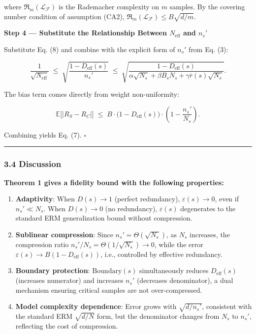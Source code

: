 \documentclass[
  12pt,
]{article}
\begin{document}
where \(\mathfrak{R}_{m}(\mathcal{L}_{\mathcal{F}})\) is the Rademacher complexity on \(m\) samples. By the covering number condition of assumption (CA2),
\(\mathfrak{R}_{m}(\mathcal{L}_{\mathcal{F}}) \leq B \sqrt{d/m}\).

\textbf{Step 4 --- Substitute the Relationship Between \(N_{\text{eff}}\) and \(n_s'\)}

Substitute Eq. (8) and combine with the explicit form of \(n_s'\) from Eq. (3):

\[
\frac{1}{\sqrt{N_{\text{eff}}}}
\;\leq\; \sqrt{\frac{1 - D_{\text{eff}}(s)}{n_s'}}
\;\leq\; \sqrt{\frac{1 - D_{\text{eff}}(s)}{\alpha \sqrt{N_s} + \beta B_s N_s + \gamma \bar{r}(s)\sqrt{N_s}}}.
\]

The bias term comes directly from weight non-uniformity:

\[
\mathbb{E}\bigl[|R_S - R_C|\bigr]
\;\leq\; B \cdot \bigl(1 - D_{\text{eff}}(s)\bigr) \cdot \left(1 - \frac{n_s'}{N_s}\right).
\]

Combining yields Eq. (7). \(\square\)

\begin{center}\rule{0.5\linewidth}{0.5pt}\end{center}

\subsubsection{3.4 Discussion}\label{discussion}

\textbf{Theorem 1 gives a fidelity bound with the following properties:}

\begin{enumerate}
\def\labelenumi{\arabic{enumi}.}
\item
  \textbf{Adaptivity}: When \(D(s) \to 1\) (perfect redundancy), \(\varepsilon(s) \to 0\), even if \(n_s' \ll N_s\). When \(D(s) \to 0\) (no redundancy), \(\varepsilon(s)\)
  degenerates to the standard ERM generalization bound without compression.
\item
  \textbf{Sublinear compression}: Since \(n_s' = \Theta(\sqrt{N_s})\), as \(N_s\)
  increases, the compression ratio \(n_s'/N_s = \Theta(1/\sqrt{N_s}) \to 0\), while the error
  \(\varepsilon(s) \to B(1-D_{\text{eff}}(s))\), i.e., controlled by effective redundancy.
\item
  \textbf{Boundary protection}: \(\text{Boundary}(s)\) simultaneously reduces
  \(D_{\text{eff}}(s)\) (increases numerator) and increases
  \(n_s'\) (decreases denominator), a dual mechanism ensuring critical samples are not over-compressed.
\item
  \textbf{Model complexity dependence}: Error grows with \(\sqrt{d/n_s'}\), consistent with the standard ERM
  \(\sqrt{d/N}\) form, but the denominator changes from \(N_s\) to
  \(n_s'\), reflecting the cost of compression.
\end{enumerate}
\end{document}

